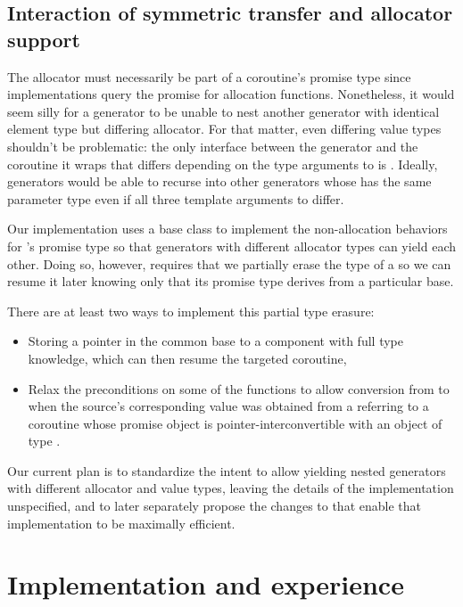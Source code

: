 \documentclass{wg21}
\begin{document}
\subsection{Interaction of symmetric transfer and allocator support}

The allocator must necessarily be part of a coroutine's promise type
since implementations query the promise for allocation functions.
Nonetheless, it would seem silly for a generator to be unable to nest another
generator with identical element type but differing allocator.
For that matter, even differing value types shouldn't be problematic:
the only interface between the generator and the coroutine it wraps
that differs depending on the type arguments to 
is .
Ideally, generators would be able to recurse into other generators
whose  has the same parameter type
even if all three template arguments to  differ.

Our implementation uses a base class
to implement the non-allocation behaviors
for 's promise type
so that generators with different allocator types
can yield each other.
Doing so, however, requires that we partially erase
the type of a  so we can resume it later
knowing only that its promise type derives from a particular base.

There are at least two ways to implement this partial type erasure:
\begin{itemize}
\item Storing a pointer in the common base to
  a component with full type knowledge, which can then
  resume the targeted coroutine,
\item Relax the preconditions on some of the  functions
  to allow conversion from
   to  when
  the source's corresponding  value was obtained from
  a  referring to a coroutine whose promise object
  is pointer-interconvertible with an object of type .
\end{itemize}

Our current plan is to standardize
the intent to allow yielding nested generators
with different allocator and value types,
leaving the details of the implementation unspecified,
and to later separately propose the changes to 
that enable that implementation to be maximally efficient.


\section{Implementation and experience}
\end{document}
